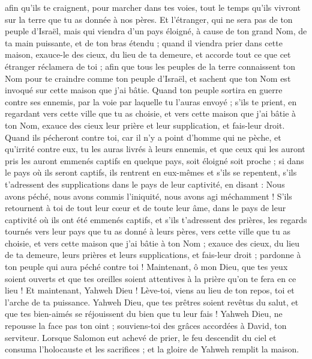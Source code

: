 \begin{multicols}{2}
afin qu'ils te craignent, pour marcher dans tes voies, tout le temps qu'ils vivront sur la terre que tu as donnée à nos pères.
Et l'étranger, qui ne sera pas de ton peuple d'Israël, mais qui viendra d'un pays éloigné, à cause de ton grand Nom, de ta main puissante, et de ton bras étendu ; quand il viendra prier dans cette maison,
exauce-le des cieux, du lieu de ta demeure, et accorde tout ce que cet étranger réclamera de toi ; afin que tous les peuples de la terre connaissent ton Nom pour te craindre comme ton peuple d'Israël, et sachent que ton Nom est invoqué sur cette maison que j'ai bâtie.
Quand ton peuple sortira en guerre contre ses ennemis, par la voie par laquelle tu l'auras envoyé ; s'ils te prient, en regardant vers cette ville que tu as choisie, et vers cette maison que j'ai bâtie à ton Nom,
exauce des cieux leur prière et leur supplication, et fais-leur droit.
Quand ils pécheront contre toi, car il n'y a point d'homme qui ne pèche, et qu'irrité contre eux, tu les auras livrés à leurs ennemis, et que ceux qui les auront pris les auront emmenés captifs en quelque pays, soit éloigné soit proche ;
si dans le pays où ils seront captifs, ils rentrent en eux-mêmes et s'ils se repentent, s'ils t'adressent des supplications dans le pays de leur captivité, en disant : Nous avons péché, nous avons commis l'iniquité, nous avons agi méchamment !
S'ils retournent à toi de tout leur cœur et de toute leur âme, dans le pays de leur captivité où ils ont été emmenés captifs, et s'ils t'adressent des prières, les regards tournés vers leur pays que tu as donné à leurs pères, vers cette ville que tu as choisie, et vers cette maison que j'ai bâtie à ton Nom ;
exauce des cieux, du lieu de ta demeure, leurs prières et leurs supplications, et fais-leur droit ; pardonne à ton peuple qui aura péché contre toi !
Maintenant, ô mon Dieu, que tes yeux soient ouverts et que tes oreilles soient attentives à la prière qu'on te fera en ce lieu !
Et maintenant, Yahweh Dieu ! Lève-toi, viens au lieu de ton repos, toi et l'arche de ta puissance. Yahweh Dieu, que tes prêtres soient revêtus du salut, et que tes bien-aimés se réjouissent du bien que tu leur fais !
Yahweh Dieu, ne repousse la face pas ton oint ; souviens-toi des grâces accordées à David, ton serviteur.
\VerseOne{}Lorsque Salomon eut achevé de prier, le feu descendit du ciel et consuma l'holocauste et les sacrifices ; et la gloire de Yahweh remplit la maison.

\end{multicols}
